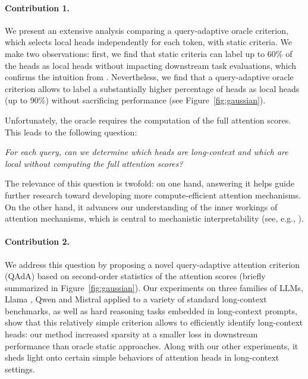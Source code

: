 \paragraph{Contribution 1.} We present an extensive analysis comparing a query-adaptive oracle criterion, which selects local heads independently for each token, with static criteria. We make two observations: first, we find that static criteria can label up to 60\% of the heads as local heads without impacting downstream task evaluations, which confirms the intuition from \citep{wu2024retrieval}. Nevertheless, we find that a query-adaptive oracle criterion allows to label a substantially higher percentage of heads as local heads (up to 90\%) without sacrificing performance (see Figure~\ref{fig:gaussian}).


Unfortunately, the oracle requires the computation of the full attention scores. This leads to the following question:
\begin{center}
    \textit{ For each query, can we determine which heads are long-context and which are local without computing the full attention scores?}
\end{center}

The relevance of this question is twofold: on one hand, answering it helps guide further research toward developing more compute-efficient attention mechanisms. On the other hand, it advances our understanding of the inner workings of attention mechanisms, which is central to mechanistic interpretability (see, e.g., \citet{olsson2022context}). 

\paragraph{Contribution 2.} We address this question by proposing a novel query-adaptive attention criterion (QAdA) based on second-order statistics of the attention scores (briefly summarized in Figure~\ref{fig:gaussian}).
Our experiments on three families of LLMs, Llama \citep{dubey2024llama}, Qwen \citep{bai2023qwen} and Mistral \citep{jiang2023mistral} applied to a variety of standard long-context benchmarks, as well as hard  reasoning tasks embedded in long-context prompts, show that this relatively simple criterion allows to efficiently identify long-context heads: our method increased sparsity at a smaller loss in downstream performance than oracle static approaches. 
Along with our other experiments, it sheds light onto certain simple behaviors of attention heads in long-context settings. 


 


